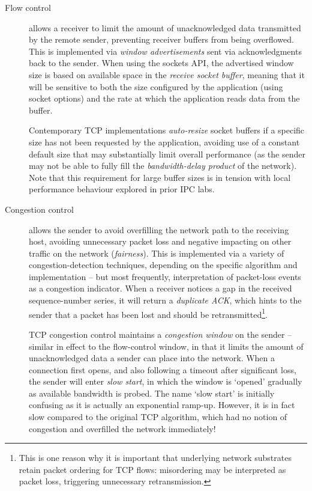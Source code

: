 \documentclass[a4paper,10pt]{article}
\begin{document}
\begin{description}
\item[Flow control] allows a receiver to limit the amount of unacknowledged
  data transmitted by the remote sender, preventing receiver buffers from
  being overflowed.
  This is implemented via \textit{window advertisements} sent via
  acknowledgments back to the sender.
  When using the sockets API, the advertised window size is based on available
  space in the \textit{receive socket buffer}, meaning that it will be
  sensitive to both the size configured by the application (using socket
  options) and the rate at which the application reads data from the buffer.

  Contemporary TCP implementations \textit{auto-resize} socket buffers if a
  specific size has not been requested by the application, avoiding use of a
  constant default size that may substantially limit overall performance (as
  the sender may not be able to fully fill the \textit{bandwidth-delay
  product} of the network).
  Note that this requirement for large buffer sizes is in tension with local
  performance behaviour explored in prior IPC labs.

\item[Congestion control] allows the sender to avoid overfilling the network
  path to the receiving host, avoiding unnecessary packet loss and negative
  impacting on other traffic on the network (\textit{fairness}).
  This is implemented via a variety of congestion-detection techniques,
  depending on the specific algorithm and implementation -- but most
  frequently, interpretation of packet-loss events as a congestion indicator.
  When a receiver notices a gap in the received sequence-number series, it
  will return a \textit{duplicate ACK}, which hints to the sender that a
  packet has been lost and should be retransmitted\footnote{This is one reason
  why it is important that underlying network substrates retain packet
  ordering for TCP flows: misordering may be interpreted as packet loss,
  triggering unnecessary retransmission.}.

  TCP congestion control maintains a \textit{congestion window} on the sender
  -- similar in effect to the flow-control window, in that it limits the
  amount of unacknowledged data a sender can place into the network.
  When a connection first opens, and also following a timeout after
  significant loss, the sender will enter \textit{slow start}, in which the
  window is `opened' gradually as available bandwidth is probed.
  The name `slow start' is initially confusing as it is actually an
  exponential ramp-up.
  However, it is in fact slow compared to the original TCP algorithm, which
  had no notion of congestion and overfilled the network immediately!


\end{description}
\end{document}
